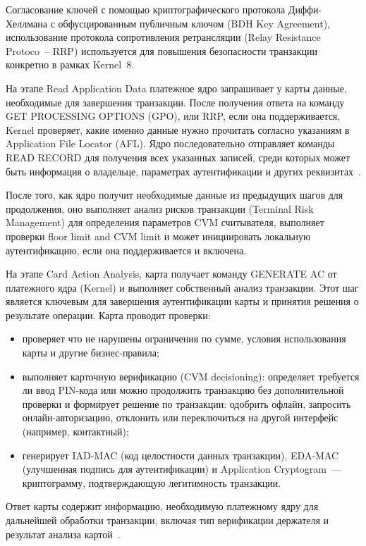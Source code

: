 Согласование ключей с помощью криптографического протокола Диффи-Хеллмана с обфусцированным публичным ключом (BDH Key Agreement), использование протокола сопротивления ретрансляции (Relay Resistance Protoco~-- RRP) используется для повышения безопасности транзакции конкретно в рамках Kernel~8.

На этапе Read Application Data платежное ядро запрашивает у карты данные, необходимые для завершения транзакции.
После получения ответа на команду GET PROCESSING OPTIONS (GPO), или RRP, если она поддерживается, Kernel проверяет, какие именно данные нужно прочитать согласно указаниям в Application File Locator (AFL).
Ядро последовательно отправляет команды READ RECORD для получения всех указанных записей, среди которых может быть информация о владельце, параметрах аутентификации и других реквизитах~\cite{emv_book_c8}.

После того, как ядро получит необходимые данные из предыдущих шагов для продолжения, оно выполняет анализ рисков транзакции (Terminal Risk Management) для определения параметров CVM считывателя, выполняет проверки floor limit and CVM limit и может инициировать локальную аутентификацию, если она поддерживается и включена.

На этапе Card Action Analysis, карта получает команду GENERATE AC от платежного ядра (Kernel) и выполняет собственный анализ транзакции.
Этот шаг является ключевым для завершения аутентификации карты и принятия решения о результате операции.
Карта проводит проверки:

\begin{itemize}
    \item проверяет что не нарушены ограничения по сумме, условия использования карты и другие бизнес-правила;
    \item выполняет карточную верификацию (CVM decisioning): определяет требуется ли ввод PIN-кода или можно продолжить транзакцию без дополнительной проверки и формирует решение по транзакции: одобрить офлайн, запросить онлайн-авторизацию, отклонить или переключиться на другой интерфейс (например, контактный);
    \item генерирует IAD-MAC (код целостности данных транзакции), EDA-MAC (улучшенная подпись для аутентификации) и Application Cryptogram~--- криптограмму, подтверждающую легитимность транзакции.
\end{itemize}

Ответ карты содержит информацию, необходимую платежному ядру для дальнейшей обработки транзакции, включая тип верификации держателя и результат анализа картой~\cite{emv_book_c8}.

